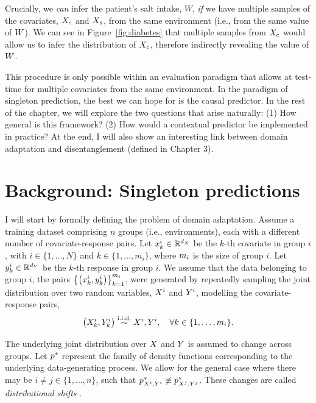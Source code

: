 \documentclass[../thesis.tex]{subfiles}
\begin{document}
Crucially, we \textit{can} infer the patient's salt intake, $W$, \textit{if} we have multiple samples of the covariates, $\myrv{x}_{c}$ and $\myrv{x}_{s}$, from the same environment (i.e., from the same value of $\myrv{w}$). We can see in Figure~\ref{fig:diabetes} that multiple samples from $\myrv{x}_{c}$ would allow us to infer the distribution of $\myrv{x}_{c}$, therefore indirectly revealing the value of $\myrv{w}$.

This procedure is only possible within an evaluation paradigm that allows at test-time for multiple covariates from the same environment. In the paradigm of singleton prediction, the best we can hope for is the causal predictor. In the rest of the chapter, we will explore the two questions that arise naturally: (1) How general is this framework? (2) How would a contextual predictor be implemented in practice? At the end, I will also show an interesting link between domain adaptation and disentanglement (defined in Chapter 3).

\section{Background: Singleton predictions}

I will start by formally defining the problem of domain adaptation. Assume a training dataset comprising $n$ groups (i.e., environments), each with a different number of covariate-response pairs. Let $\myvect{x}^i_k \in \mathbb{R}^{\mydim{x}}$ be the $k$-th covariate in group $i$, with $i \in \{1,\dots,N\}$ and $k \in \{1,\dots,m_i\}$, where $m_i$ is the size of group $i$. Let $\myvect{y}^i_{k} \in \mathbb{R}^{\mydim{y}}$ be the $k$-th response in group $i$. We assume that the data belonging to group $i$, the pairs $\left\{ \left( x^i_{k}, y^i_{k} \right) \right\}_{k=1}^{m_i}$, were generated by repeatedly sampling the joint distribution over two random variables, $\myrv{x}^i$ and $\myrv{y}^i$, modelling the covariate-response pairs, 
\[
    \left( \myrv{x}^i_{k}, \myrv{y}^i_{k} \right) \overset{\mathrm{i.i.d.}}{\sim} \myrv{x}^i, \myrv{y}^i, \quad \forall k \in \{1,\dots,\mycnt{m}_i\}. 
\]

The underlying joint distribution over $\myrv{x}$ and $\myrv{y}$ is assumed to change across groups. Let $p^*$ represent the family of density functions corresponding to the underlying data-generating process. We allow for the general case where there may be $i \neq j \in \{1,\dots,n\}$, such that $\myfunc{p}^{*}_{\myrv{x}^i, \myrv{y}^i} \not\equiv \myfunc{p}^{*}_{\myrv{x}^j, \myrv{y}^j}$. These changes are called \textit{distributional shifts} \citep{quinonero-candelaDatasetShiftMachine2008}. 
\end{document}
